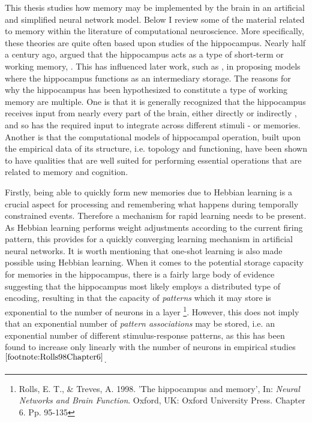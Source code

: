 This thesis studies how memory may be implemented by the brain in an artificial and simplified neural network model. Below I review some of the material related to memory within the literature of computational neuroscience. More specifically, these theories are quite often based upon studies of the hippocampus.
Nearly half a century ago, \cite{Marr1971} argued that the hippocampus acts as a type of short-term or working memory, \citep{Rolls1998chpt6}. This has influenced later work, such as \citep{McClelland1995}, in proposing models where the hippocampus functions as an intermediary storage. The reasons for why the hippocampus has been hypothesized to constitute a type of working memory are multiple. One is that it is generally recognized that the hippocampus receives input from nearly every part of the brain, either directly or indirectly \citep{Rolls1998chpt1}, and so has the required input to integrate across different stimuli - or memories. Another is that the computational models of hippocampal operation, built upon the empirical data of its structure, i.e. topology and functioning, have been shown to have qualities that are well suited for performing essential operations that are related to memory and cognition.

Firstly, being able to quickly form new memories due to Hebbian learning is a crucial aspect for processing and remembering what happens during temporally constrained events. Therefore a mechanism for rapid learning needs to be present. As Hebbian learning performs weight adjustments according to the current firing pattern, this provides for a quickly converging learning mechanism in artificial neural networks. It is worth mentioning that one-shot learning is also made possible using Hebbian learning. 
When it comes to the potential storage capacity for memories in the hippocampus, there is a fairly large body of evidence suggesting that the hippocampus most likely employs a distributed type of encoding, resulting in that the capacity of \textit{patterns} which it may store is exponential to the number of neurons in a layer
\footnote{\label{footnote:Rolls98Chapter6}Rolls, E. T., \& Treves, A. 1998. 'The hippocampus and memory', In: \textit{Neural Networks and Brain Function}. Oxford, UK: Oxford University Press. Chapter 6. Pp. 95-135}. However, this does not imply that an exponential number of \textit{pattern associations} may be stored, i.e. an exponential number of different stimulus-response patterns, as this has been found to increase only linearly with the number of neurons in empirical studies$^{\ref{footnote:Rolls98Chapter6}}$.

